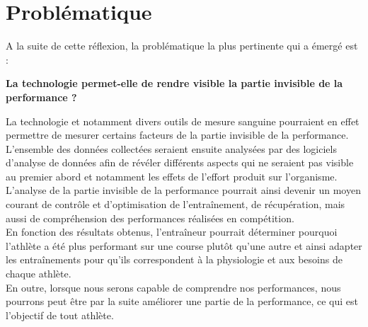 \chapter*{Problématique}
\label{chap:problématique}

A la suite de cette réflexion, la problématique la plus pertinente qui a émergé est : \\

\vspace{10pt}

\textbf{La technologie permet-elle de rendre visible la partie invisible de la performance ?}\\

\vspace{10pt}

La technologie et notamment divers outils de mesure sanguine pourraient en effet permettre de mesurer certains facteurs de la partie invisible de la performance.\\  

L'ensemble des données collectées seraient ensuite analysées par des logiciels d'analyse de données afin de révéler différents aspects qui ne seraient pas visible au premier abord et notamment les effets de l'effort produit sur l'organisme. \\

L'analyse de la partie invisible de la performance pourrait ainsi devenir un moyen courant de contrôle et d'optimisation de l'entraînement, de récupération, mais aussi de compréhension des performances réalisées en compétition.\\

En fonction des résultats obtenus, l'entraîneur pourrait déterminer pourquoi l'athlète a été plus performant sur une course plutôt qu'une autre et ainsi adapter les entraînements pour qu'ils correspondent à la physiologie et aux besoins de chaque athlète.\\

En outre, lorsque nous serons capable de comprendre nos performances, nous pourrons peut être par la suite améliorer une partie de la performance, ce qui est l'objectif de tout athlète.




